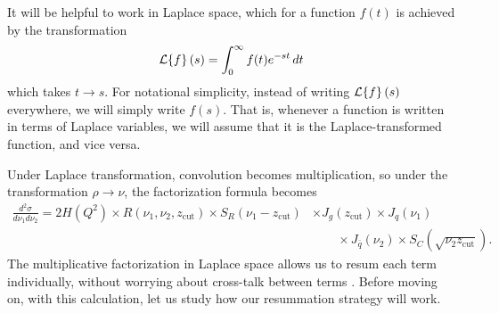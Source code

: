 \documentclass[../thesis.tex]{subfiles}
\providecommand{\zcut}{z_\mathrm{{cut}}}
\providecommand{\cL}{\mathcal{L}}
\begin{document}
	It will be helpful to work in Laplace space, which for a function $f(t)$ is achieved by the transformation \cite{boas_mathematical_2006}
	\begin{equation}
		\cL\qty{f}(s) = \int_0^\infty f(t) e^{-st}\,dt
	\end{equation}
	which takes $t \to s$. For notational simplicity, instead of writing $\cL\qty{f}(s)$ everywhere, we will simply write $f(s)$. That is, whenever a function is written in terms of Laplace variables, we will assume that it is the Laplace-transformed function, and vice versa.

	Under Laplace transformation, convolution becomes multiplication, so under the transformation $\rho \to \nu$, the factorization formula becomes
	\begin{equation}\label{all-eq:factorization formula laplace}
	\begin{aligned}
		\frac{d^2\sigma}{d\nu_1 d\nu_2} = 2 H(Q^2) \times R(\nu_1, \nu_2, \zcut) \times S_R(\nu_1 - \zcut) &\times J_g(\zcut) \times J_q(\nu_1) \\
		&\qquad\times J_{\bar q}(\nu_2) \times S_C(\sqrt{\nu_2 \zcut}).
	\end{aligned}
	\end{equation}
	The multiplicative factorization in Laplace space allows us to resum each term individually, without worrying about cross-talk between terms \cite{frye_factorization_2016}. Before moving on, with this calculation, let us study how our resummation strategy will work.
\end{document}
